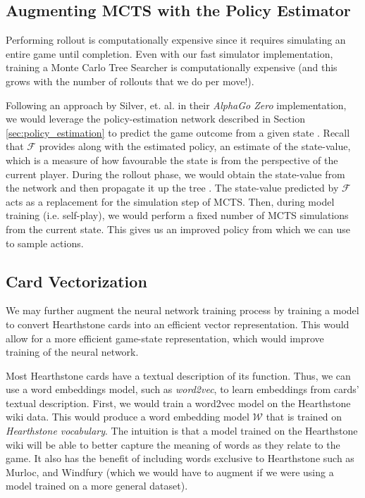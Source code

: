 \documentclass{paper}
\begin{document}
\subsection{Augmenting MCTS with the Policy Estimator}
Performing rollout is computationally expensive since it requires simulating an entire game until completion. Even with our fast simulator implementation, training a Monte Carlo Tree Searcher is computationally expensive (and this grows with the number of rollouts that we do per move!).

Following an approach by Silver, et. al. in their \textit{AlphaGo Zero} implementation, we would leverage the policy-estimation network described in Section \ref{sec:policy_estimation} to predict the game outcome from a given state \cite{Silver2017}. Recall that $\mathcal{F}$ provides along with the estimated policy, an estimate of the state-value, which is a measure of how favourable the state is from the perspective of the current player. During the rollout phase, we would obtain the state-value from the network and then propagate it up the tree \cite{alpha_zero}. The state-value predicted by $\mathcal{F}$ acts as a replacement for the simulation step of MCTS. Then, during model training (i.e. self-play), we would perform a fixed number of MCTS simulations from the current state. This gives us an improved policy from which we can use to sample actions.

\subsection{Card Vectorization}

We may further augment the neural network training process by training a model to convert Hearthstone cards into an efficient vector representation. This would allow for a more efficient game-state representation, which would improve training of the neural network.

Most Hearthstone cards have a textual description of its function. Thus, we can use a word embeddings model, such as \textit{word2vec}, to learn embeddings from cards' textual description. First, we would train a word2vec model on the Hearthstone wiki data. This would produce a word embedding model $\mathcal{W}$ that is trained on \textit{Hearthstone vocabulary}. The intuition is that a model trained on the Hearthstone wiki will be able to better capture the meaning of words as they relate to the game. It also has the benefit of including words exclusive to Hearthstone such as Murloc, and Windfury (which we would have to augment if we were using a model trained on a more general dataset).
\end{document}
